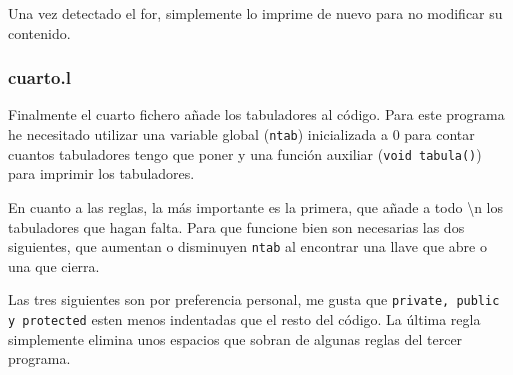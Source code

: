 \documentclass[10pt]{article}
\begin{document}
    Una vez detectado el for, simplemente lo imprime de nuevo para no modificar su contenido.

    \subsubsection{cuarto.l}

    Finalmente el cuarto fichero añade los tabuladores al código. Para este programa he necesitado utilizar una variable global (\texttt{ntab}) inicializada a 0 para contar cuantos tabuladores tengo que poner y una función auxiliar (\texttt{void tabula()}) para imprimir los tabuladores.

    En cuanto a las reglas, la más importante es la primera, que añade a todo \textbackslash n los tabuladores que hagan falta. Para que funcione bien son necesarias las dos siguientes, que aumentan o disminuyen \texttt{ntab} al encontrar una llave que abre o una que cierra.

    Las tres siguientes son por preferencia personal, me gusta que \texttt{private, public y protected} esten menos indentadas que el resto del código. La última regla simplemente elimina unos espacios que sobran de algunas reglas del tercer programa.
\end{document}
